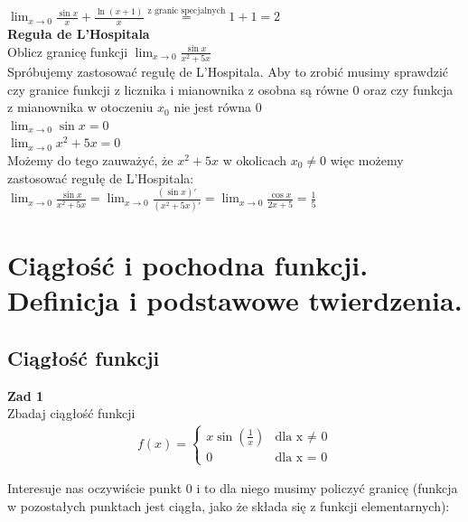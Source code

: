 \documentclass[12pt]{article}
\begin{document}
	\noindent $\lim_{x \to 0} \frac{\sin{x}}{x} + \frac{\ln(x + 1)}{x} \stackrel{\text{z granic specjalnych}}{=} 1 + 1 = 2$ \\


	\noindent \textbf{Reguła de L'Hospitala} \\

	\noindent Oblicz granicę funkcji $\lim_{x \to 0} \frac{\sin{x}}{x^2 + 5x}$ \\

	\noindent Spróbujemy zastosować regułę de L'Hospitala. Aby to zrobić musimy sprawdzić czy granice funkcji z licznika i mianownika z osobna są równe 0 oraz czy funkcja z mianownika w otoczeniu $x_{0}$ nie jest równa 0 \\

	\noindent $\lim_{x \to 0} \sin{x} = 0$ \\
	\noindent $\lim_{x \to 0} x^2 + 5x = 0$ \\
	\noindent Możemy do tego zauważyć, że $x^2 + 5x$ w okolicach $x_{0} \neq 0$ więc możemy zastosować regułę de L'Hospitala: \\

	\noindent $\lim_{x \to 0} \frac{\sin{x}}{x^2 + 5x} = \lim_{x \to 0} \frac{(\sin{x})'}{(x^2 + 5x)'} = \lim_{x \to 0} \frac{\cos{x}}{2x + 5} = \frac{1}{5}$


    \newpage

    \section{Ciągłość i pochodna funkcji. Definicja i podstawowe twierdzenia.}

	\subsection{Ciągłość funkcji}

	\textbf{Zad 1} \\

	\noindent Zbadaj ciągłość funkcji \begin{align*} f(x) =
																		\begin{cases}
																			x \sin(\frac{1}{x}) & \text{dla x $\neq$ 0} \\
																			0 & \text{dla x = 0}
																		\end{cases}
															\end{align*}

	\noindent Interesuje nas oczywiście punkt 0 i to dla niego musimy policzyć granicę (funkcja w pozostałych punktach jest ciągła, jako że składa się z funkcji elementarnych): \\
\end{document}
